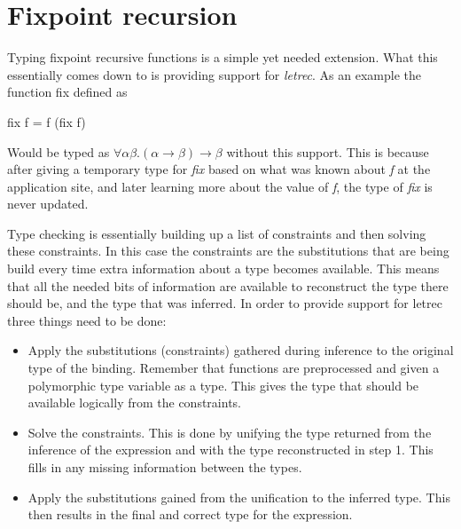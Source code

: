 \begin{prooftree}
\end{prooftree}

\begin{prooftree}
\end{prooftree} 
\section{Fixpoint recursion}
Typing fixpoint recursive functions is a simple yet needed extension. What this essentially comes down to is providing support for \emph{letrec}. As an example the function fix defined as

\begin{code}
fix f = f (fix f)
\end{code} 

Would be typed as $\forall \alpha \beta. (\alpha \rightarrow \beta) \rightarrow \beta$ without this support. This is because after giving a temporary type for \emph{fix} based on what was known about \emph{f} at the application site, and later learning more about the value of \emph{f}, the type of \emph{fix} is never updated.

Type checking is essentially building up a list of constraints and then solving these constraints. In this case the constraints are the substitutions that are being build every time extra information about a type becomes available.
This means that all the needed bits of information are available to reconstruct the type there should be, and the type that was inferred. In order to provide support for letrec three things need to be done:

\begin{itemize}
\item Apply the substitutions (constraints) gathered during inference to the original type of the binding. Remember that functions are preprocessed and given a polymorphic type variable as a type. This gives the type that should be available logically from the constraints.
\item Solve the constraints. This is done by unifying the type returned from the inference of the expression and with the type reconstructed in step 1. This fills in any missing information between the types.
\item Apply the substitutions gained from the unification to the inferred type. This then results in the final and correct type for the expression.
\end{itemize}

